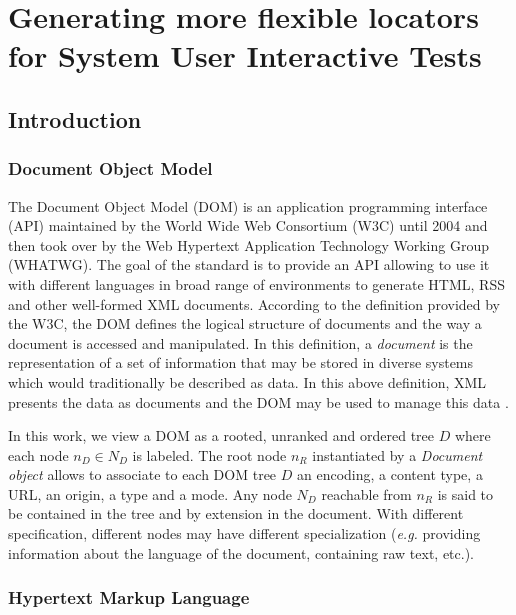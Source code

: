 \chapter{Generating more flexible locators for System User Interactive Tests}
\section{Introduction}
\label{sec:hpath-introduction}

\subsection{Document Object Model}
\label{sec:hpath-introduction-DOM}

The Document Object Model (DOM) is an application programming interface (API) maintained by the World Wide Web Consortium (W3C) until 2004 and then took over by the Web Hypertext Application Technology Working Group (WHATWG). The goal of the standard is to provide an API allowing to use it with different languages in broad range of environments to generate HTML, RSS and other well-formed XML documents. According to the definition provided by the W3C, the DOM defines the logical structure of documents and the way a document is accessed and manipulated. In this definition, a \emph{document} is the representation of a set of information that may be stored in diverse systems which would traditionally be described as data. In this above definition, XML presents the data as documents and the DOM may be used to manage this data \cite{W3C2004}.

In this work, we view a DOM as a rooted, unranked and ordered tree $D$ where each node $n_D \in N_D$ is labeled. The root node $n_R$ instantiated by a \emph{Document object} allows to associate to each DOM tree $D$ an encoding, a content type, a URL, an origin, a type and a mode. Any node $N_D$ reachable from $n_R$ is said to be contained in the tree and by extension in the document. With different specification, different nodes may have different specialization (\emph{e.g.} providing information about the language of the document, containing raw text, etc.).

\subsection{Hypertext Markup Language}
\label{sec:hpath-introduction-HTML}

